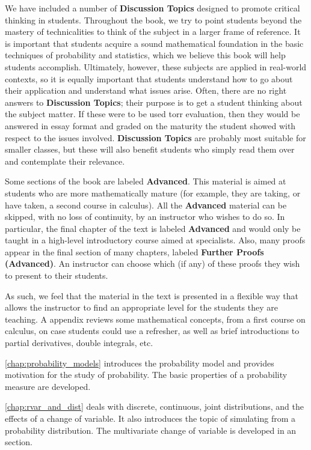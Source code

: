 We have included a number of \textbf{Discussion Topics} designed to promote critical thinking in students. Throughout the book, we try to point students beyond the mastery of technicalities to think of the subject in a larger frame of reference. It is important that students acquire a sound mathematical foundation in the basic techniques of probability and statistics, which we believe this book will help students accomplish. Ultimately, however, these subjects are applied in real-world contexts, so it is equally important that students understand how to go about their application and understand what issues arise. Often, there are no right answers to \textbf{Discussion Topics}; their purpose is to get a student thinking about the subject matter. If these were to be used torr evaluation, then they would be answered in essay format and graded on the maturity the student showed with respect to the issues  involved. \textbf{Discussion Topics} are probably most suitable for smaller classes, but these will also benefit students who simply read them over and contemplate their relevance.

Some sections of the book are labeled \textbf{Advanced}. This material is aimed at students who are more mathematically mature (for example, they are taking, or have taken, a second course in calculus). All the \textbf{Advanced} material can be skipped, with no loss of continuity, by an instructor who wishes to do so. In particular, the final chapter of the text is labeled \textbf{Advanced} and would only be taught in a high-level introductory course aimed at specialists. Also, many proofs appear in the final section of many chapters, labeled \textbf{Further Proofs (Advanced)}. An instructor can choose which (if any) of these proofs they wish to present to their students.

As such, we feel that the material in the text is presented in a flexible way that allows the instructor to find an appropriate level for the students they are teaching. A  appendix reviews some mathematical concepts, from a first course on calculus, on case students could use a refresher, as well as brief introductions to partial derivatives, double integrals, etc.

\autoref{chap:probability_models} introduces the probability model and provides motivation for the study of probability. The basic properties of a probability measure are developed.

\autoref{chap:rvar_and_dist} deals with discrete, continuous, joint distributions, and the effects of a change of variable. It also introduces the topic of simulating from a probability distribution. The multivariate change of variable is developed in an  section.

